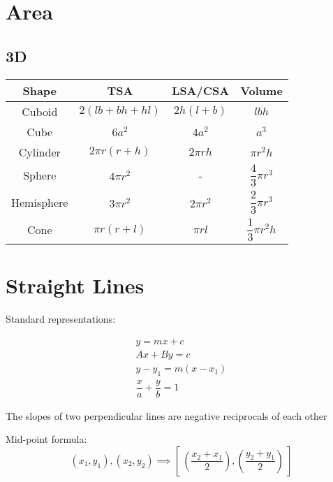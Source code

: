 \documentclass[openany]{book}
\begin{document}
\chapter{Area}

\section{3D}
\begin{table}
	\centering
	\begin{tabular}{cccc}
		\toprule
		Shape      & TSA               & LSA/CSA         & Volume                       \\
		\midrule
		Cuboid     & \(2( lb+bh+hl)\)  & \(2h (l + b)\)  & \( lbh \)                    \\
		Cube       & \(6a^2\)          & \(4a^2\)        & \(a^3\)                      \\
		Cylinder   & \( 2\pi r(r+h) \) & \(2\pi rh\)     & \( \pi r^2 h \)              \\
		Sphere     & \( 4\pi r^2 \)    & -               & \( \dfrac{4}{3}\pi r^3 \)    \\
		Hemisphere & \( 3 \pi r^2 \)   & \( 2 \pi r^2 \) & \( \dfrac{2}{3}\pi r^3 \)    \\
		Cone       & \( \pi r (r+l) \) & \( \pi rl \)    & \( \dfrac{1}{3} \pi r^2 h \) \\
		\bottomrule
	\end{tabular}
	\label{tab:3D}
\end{table}

\chapter{Straight Lines}

Standard representations:

\begin{multline*}
	y=mx+c\\
	Ax+By=c\\
	y-y_1=m(x-x_1)\\
	\dfrac{x}{a}+\dfrac{y}{b}=1
\end{multline*}

\begin{theorem}
	The slopes of two perpendicular lines are negative reciprocals of each other
\end{theorem}

Mid-point formula:
\[
	(x_1, y_1), (x_2, y_2) \implies \left[\  \left( \dfrac{x_2 + x_1}{2} \right), \left( \dfrac{y_2 + y_1}{2} \right)\ \right]
\]
\end{document}
